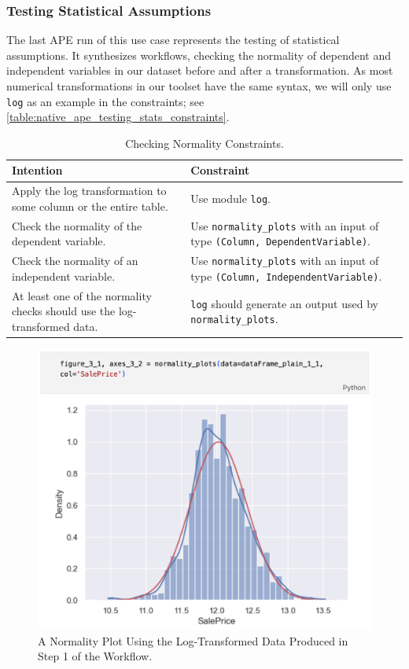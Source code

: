 \subsubsection{Testing Statistical Assumptions}

The last APE run of this use case represents the testing of statistical assumptions. It synthesizes workflows, checking the normality of dependent and independent variables in our dataset before and after a transformation. As most numerical transformations in our toolset have the same syntax, we will only use \verb|log| as an example in the constraints; see \autoref{table:native_ape_testing_stats_constraints}.
\begin{table}[h]
\centering
\footnotesize
\begin{tabular}{|p{}|p{}|}
\hline
\textbf{Intention} & \textbf{Constraint} \\
\hline
Apply the log transformation to some column or the entire table. & Use module \texttt{log}. \\
\hline
Check the normality of the dependent variable. & Use \texttt{normality\_plots} with an input of type \texttt{(Column, DependentVariable)}. \\
\hline
Check the normality of an independent variable. & Use \texttt{normality\_plots} with an input of type \texttt{(Column, IndependentVariable)}. \\
\hline
At least one of the normality checks should use the log-transformed data. & \texttt{log} should generate an output used by \texttt{normality\_plots}. \\
\hline
\end{tabular}
\caption{Checking Normality Constraints.}
\label{table:native_ape_testing_stats_constraints}
\end{table}

\begin{figure}[h]
    \centering
    \includegraphics[width=0.5\linewidth]{Tex//images//native_ape_eval//normalityplot_log.png}
    \caption{A Normality Plot Using the Log-Transformed Data Produced in Step 1 of the Workflow.}
    \label{fig:native_ape_normalityplot}
\end{figure}

